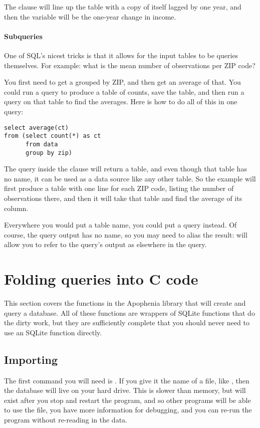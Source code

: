 The  clause will line up the table with a copy of itself
lagged by one year, and then the  variable will be the
one-year change in income.


\paragraph{Subqueries} 
One of SQL's nicest tricks is that it allows for the input tables to be
queries themselves. For example: what is the mean number of observations per
ZIP code?

You first need to get a  grouped by ZIP, and then get an
average of that. You could run a query to produce a table of counts,
save the table, and then run a query on that table to find the averages.
Here is how to do all of this in one query: 
\begin{lstlisting}
select average(ct) 
from (select count(*) as ct
      from data
      group by zip)
\end{lstlisting}
The query inside the  clause will return a table, and even
though that table has no name, it can be used as a data source like any other
table. So the example will first produce a table with one line for each
ZIP code, listing the number of observations there, and then it will
take that table and find the average of its  column.

Everywhere you would put a table name, you could put a query 
instead. Of course, the query output has no name, so you may need to
alias the result:  will allow you to refer to
the query's output as  elsewhere in the query.

\section{Folding queries into C code}\label{foldingsql}  This section covers the functions
in the Apophenia library that will create and query a database. All of
these functions are wrappers of SQLite functions that do the dirty work,
but they are sufficiently complete that you should never need to use an
SQLite function directly.

\subsection{Importing}
The first command you will need is . If you give
it the name of a file, like , then the
database will live on your hard drive. This is slower than memory, but
will exist after you stop and restart the program, and so other programs
will be able to use the file, you have more information for debugging,
and you can re-run the program without re-reading in the data.

